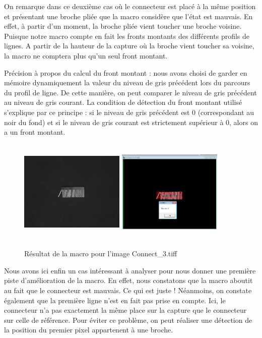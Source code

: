 \documentclass{scrreprt}
\begin{document}
On remarque dans ce deuxième cas où le connecteur est placé à la même position et présentant une broche pliée
que la macro considère que l'état est mauvais. En effet, à partir d'un moment, la broche pliée vient toucher 
une broche voisine. Puisque notre macro compte en fait les fronts montants des différents profils de lignes.
A partir de la hauteur de la capture où la broche vient toucher sa voisine, la macro ne comptera plus qu'un seul
front montant. 

Précision à propos du calcul du front montant : nous avons choisi de garder en mémoire dynamiquement la valeur du niveau
de gris précédent lors du parcours du profil de ligne. De cette manière, on peut comparer le niveau de gris précédent 
au niveau de gris courant. La condition de détection du front montant utilisé s'explique par ce principe : si le niveau de gris précédent
est 0 (correspondant au noir du fond) et si le niveau de gris courant est strictement supérieur à 0, alors on a un front montant.

\begin{figure}[!h]
\centering
\includegraphics[width=5cm, height=5cm]{images/Connect3o.png}\hfill
\includegraphics[width=5cm, height=5cm]{images/connecteur3.png}
\caption{Résultat de la macro pour l'image Connect_3.tiff}
\end{figure}

Nous avons ici enfin un cas intéressant à analyser pour nous donner une première piste d'amélioration de la macro. 
En effet, nous constatons que la macro aboutit au fait que le connecteur est mauvais. Ce qui est juste ! 
Néanmoins, on constate également que la première ligne n'est en fait pas prise en compte. Ici, le connecteur n'a pas exactement la même place 
sur la capture que le connecteur sur celle de référence. Pour éviter ce problème, on peut réaliser une détection
de la position du premier pixel appartenent à une broche. 
\end{document}
